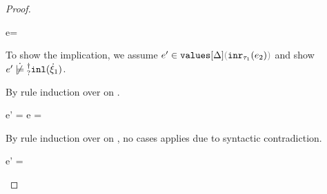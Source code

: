 \begin{proof}
\begin{byCases}
\begin{byCases}
\begin{byCases}
            \item[\text{(\ref{rule:VInr}, \ref{rule:TInr})}]
              \begin{pfsteps}
              \item e= 
              \end{pfsteps}
              To show the implication, we assume $\inValues{e'}{\Delta}{\hinr{\tau_1}{e_2}}$ and show $\cnotsatisfyormay{e'}{\cinl{\hxi_1}}$.
              \begin{pfsteps}
              \item {}  
              \end{pfsteps}
              By rule induction over  on .
              \begin{byCases}
                \item[\text{(\ref{rule:IVVal})}]
                \begin{pfsteps}
                \item e' = e =  
                \item {} 
                \end{pfsteps}

                \item[\text{(\ref{rule:IVIndet})}]
                  \begin{pfsteps}
                  \item {}  
                  \end{pfsteps}
                  By rule induction over  on
                  , no cases applies due to syntactic contradiction.

                \item[\text{(\ref{rule:IVInr})}]
                  \begin{pfsteps}
                  \item e' =  
                  \item {} 
                  \end{pfsteps}


\end{byCases}
\end{byCases}
\end{byCases}
\end{byCases}
\end{proof}
